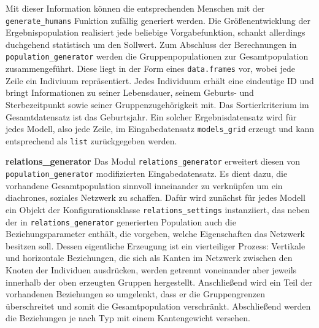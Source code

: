 \documentclass[openany,twoside,twocolumn]{book}
\begin{document}
Mit dieser Information können die entsprechenden Menschen mit der \texttt{generate\_humans} Funktion zufällig generiert werden. Die Größenentwicklung der Ergebnispopulation realisiert jede beliebige Vorgabefunktion, schankt allerdings duchgehend statistisch um den Sollwert. Zum Abschluss der Berechnungen in \texttt{population\_generator} werden die Gruppenpopulationen zur Gesamtpopulation zusammengeführt. Diese liegt in der Form eines \texttt{data.frames} vor, wobei jede Zeile ein Indiviuum repräsentiert. Jedes Individuum erhält eine eindeutige ID und bringt Informationen zu seiner Lebensdauer, seinem Geburts- und Sterbezeitpunkt sowie seiner Gruppenzugehörigkeit mit. Das Sortierkriterium im Gesamtdatensatz ist das Geburtsjahr. Ein solcher Ergebnisdatensatz wird für jedes Modell, also jede Zeile, im Eingabedatensatz \texttt{models\_grid} erzeugt und kann entsprechend als \texttt{list} zurückgegeben werden.

\textbf{relations\_generator} \newline 
Das Modul \texttt{relations\_generator} erweitert diesen von \texttt{population\_generator} modifizierten Eingabedatensatz. Es dient dazu, die vorhandene Gesamtpopulation sinnvoll inneinander zu verknüpfen um ein diachrones, soziales Netzwerk zu schaffen. Dafür wird zunächst für jedes Modell ein Objekt der Konfigurationsklasse \texttt{relations\_settings} instanziiert, das neben der in \texttt{relations\_generator} generierten Population auch die Beziehungsparameter enthält, die vorgeben, welche Eigenschaften das Netzwerk besitzen soll. Dessen eigentliche Erzeugung ist ein vierteiliger Prozess: Vertikale und horizontale Beziehungen, die sich als Kanten im Netzwerk zwischen den Knoten der Individuen ausdrücken, werden getrennt voneinander aber jeweils innerhalb der oben erzeugten Gruppen hergestellt. Anschließend wird ein Teil der vorhandenen Beziehungen so umgelenkt, dass er die Gruppengrenzen überschreitet und somit die Gesamtpopulation verschränkt. Abschließend werden die Beziehungen je nach Typ mit einem Kantengewicht versehen.
\end{document}
